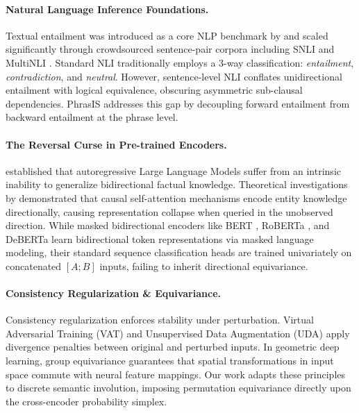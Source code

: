 \documentclass[11pt,a4paper,twocolumn]{article}
\begin{document}
\paragraph{Natural Language Inference Foundations.}
Textual entailment was introduced as a core NLP benchmark by \citet{dagan2013rte} and scaled significantly through crowdsourced sentence-pair corpora including SNLI \citep{bowman2015snli} and MultiNLI \citep{williams2018multinli}. Standard NLI traditionally employs a 3-way classification: \textit{entailment}, \textit{contradiction}, and \textit{neutral}. However, sentence-level NLI conflates unidirectional entailment with logical equivalence, obscuring asymmetric sub-clausal dependencies. PhrasIS \citep{lopezgazpio2027phrasis} addresses this gap by decoupling forward entailment from backward entailment at the phrase level.

\paragraph{The Reversal Curse in Pre-trained Encoders.}
\citet{berglund2023reversal} established that autoregressive Large Language Models suffer from an intrinsic inability to generalize bidirectional factual knowledge. Theoretical investigations by \citet{allenzhu2023physics} demonstrated that causal self-attention mechanisms encode entity knowledge directionally, causing representation collapse when queried in the unobserved direction. While masked bidirectional encoders like BERT \citep{devlin2019bert}, RoBERTa \citep{liu2019roberta}, and DeBERTa \citep{he2021debertav3} learn bidirectional token representations via masked language modeling, their standard sequence classification heads are trained univariately on concatenated $[A; B]$ inputs, failing to inherit directional equivariance.

\paragraph{Consistency Regularization \& Equivariance.}
Consistency regularization enforces stability under perturbation. Virtual Adversarial Training (VAT) \citep{miyato2018vat} and Unsupervised Data Augmentation (UDA) \citep{xie2020uda} apply divergence penalties between original and perturbed inputs. In geometric deep learning, group equivariance \citep{cohen2016group} guarantees that spatial transformations in input space commute with neural feature mappings. Our work adapts these principles to discrete semantic involution, imposing permutation equivariance directly upon the cross-encoder probability simplex.
\end{document}
